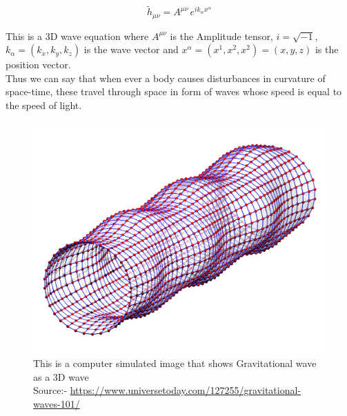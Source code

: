  \begin{equation}
     \tilde{h}_{\mu\nu} = A^{\mu\nu}\, e^{ik_{\alpha}x^{\alpha}}
 \end{equation}
 
 \noindent This is a 3D wave equation where $A^{\mu\nu}$ is the Amplitude tensor, $i = \sqrt{-1} $, $k_{\alpha} = (k_{x},k_{y},k_{z})$ is the wave vector and $x^{\alpha} = (x^{1},x^{2},x^{2}) = (x,y,z)$ is the position vector.
 \\
 
 Thus we can say that when ever a body causes disturbances in curvature of space-time, these travel through space in form of waves whose speed is equal to the speed of light.  
 
 \begin{figure}[h]
     \centering
     \includegraphics[scale=0.1.5]{images.tex/gw_representation.png}
     \caption{This is a computer simulated image that shows Gravitational wave as a 3D wave\\ Source:- \url{https://www.universetoday.com/127255/gravitational-waves-101/}}
 \end{figure}
